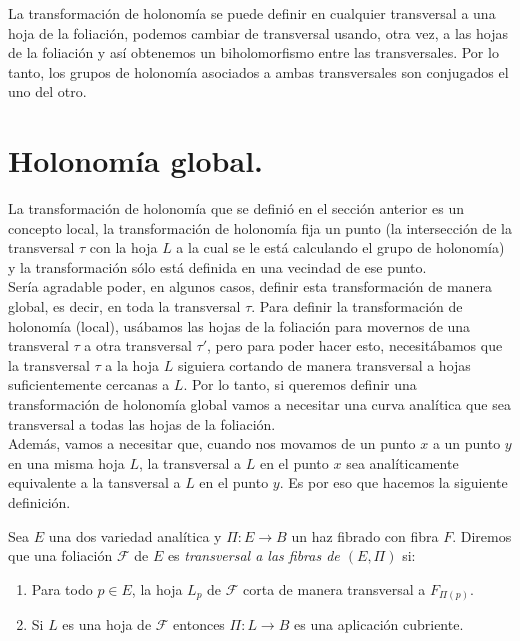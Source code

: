 La transformación de holonomía se puede definir en cualquier transversal a una hoja de la foliación, podemos cambiar de transversal usando, otra vez, a las hojas de la foliación y así obtenemos un biholomorfismo entre las transversales. Por lo tanto, los grupos de holonomía asociados a ambas transversales son conjugados el uno del otro. 

\section{Holonomía global.}

La transformación de holonomía que se definió en el sección anterior es un concepto local, la transformación de holonomía fija un punto (la intersección de la transversal $\tau$ con la hoja  $L$ a la cual se le está calculando el grupo de holonomía) y la transformación sólo está definida en una vecindad de ese punto.\\

Sería agradable poder, en algunos casos, definir esta transformación de manera global, es decir, en toda la transversal $\tau$. Para definir la transformación de holonomía (local), usábamos las hojas de la foliación para movernos de una transveral $\tau$ a otra transversal $\tau'$, pero para poder hacer esto, necesitábamos que la transversal $\tau$ a la hoja $L$ siguiera cortando de manera transversal a hojas suficientemente cercanas a $L$. Por lo tanto, si queremos definir una transformación de holonomía global vamos a necesitar una curva analítica que sea transversal a todas las hojas de la foliación.\\

Además, vamos a necesitar que, cuando nos movamos de un punto $x$ a un punto $y$ en una misma hoja $L$, la transversal a $L$ en el punto $x$ sea analíticamente equivalente a la tansversal a $L$ en el punto $y$. Es por eso que hacemos la siguiente definición.

\begin{defn}
\label{Def:FoliacionTransversal}
Sea $E$ una dos variedad analítica y $\Pi\colon E\rightarrow B$ un haz fibrado con fibra $F$. Diremos que una foliación $\mathcal{F}$ de $E$ es \emph{transversal a las fibras de $(E,\Pi)$} si:
\begin{enumerate}
\item Para todo $p\in E$, la hoja $L_{p}$ de $\mathcal{F}$ corta de manera transversal a $F_{\Pi(p)}$.

\item Si $L$ es una hoja de $\mathcal{F}$ entonces $\Pi\colon L\rightarrow B$ es una aplicación cubriente.
\end{enumerate}
\end{defn}

